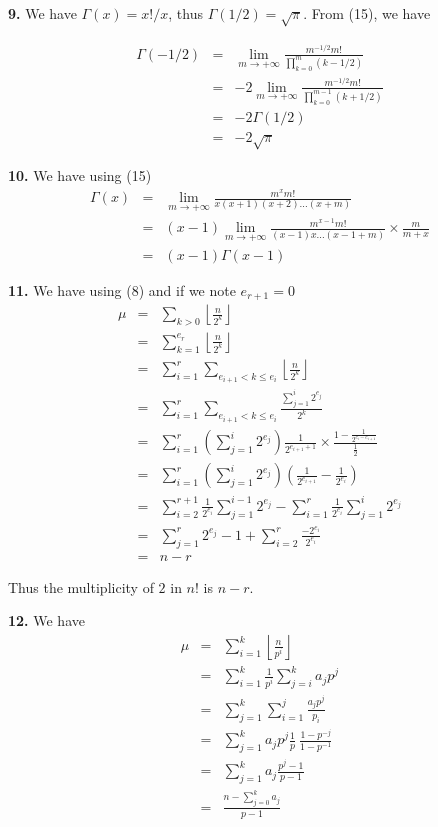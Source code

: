 \documentclass[a4paper,12pt]{article}
\newcommand{\newpar}[1]{\bigskip \noindent \textbf{#1.}}
\begin{document}
\newpar{9}  We have $\Gamma(x) = x!/x$, thus $\Gamma(1/2) =
\sqrt{\pi}$.  From (15), we have

\begin{eqnarray*}
  \Gamma(-1/2) &=& \lim_{m\to +\infty} \frac{m^{-1/2}
    m!}{\prod_{k=0}^m (k-1/2)} \\
  &=& -2\lim_{m\to +\infty} \frac{m^{-1/2}m!}{\prod_{k=0}^{m-1}(k +
    1/2)} \\
  &=& -2 \Gamma(1/2) \\
  &=& -2 \sqrt{\pi}
\end{eqnarray*}

\newpar{10} We have using (15)
\begin{eqnarray*}
  \Gamma(x) &=& \lim_{m\to +\infty} \frac{m^x m!}{x(x+1)(x+2)\ldots
    (x+m)} \\
  &=& (x-1) \lim_{m \to +\infty} \frac{m^{x-1} m!}{(x-1)x \ldots
    (x-1+m)} \times \frac{m}{m+x} \\
  &=& (x-1) \Gamma(x-1)
\end{eqnarray*}

\newpar{11} We have using (8) and if we note $e_{r+1} = 0$
\begin{eqnarray*}
  \mu &=& \sum_{k>0} \left\lfloor \frac{n}{2^k} \right\rfloor \\
  &=& \sum_{k=1}^{e_r} \left\lfloor \frac{n}{2^k} \right\rfloor \\
  &=& \sum_{i=1}^r \sum_{e_{i+1} < k \le e_i} \left\lfloor
  \frac{n}{2^k} \right\rfloor \\
  &=& \sum_{i=1}^r \sum_{e_{i+1} < k\le e_i} \frac{\sum_{j=1}^i
    2^{e_j}}{2^k} \\
  &=& \sum_{i=1}^r \left(\sum_{j=1}^i 2^{e_j}\right)
  \frac{1}{2^{e_{i+1}+1}} \times \frac{1 - \frac{1}{2^{e_i -
        e_{i+1}}}}{\frac{1}{2}} \\
  &=& \sum_{i=1}^r \left(\sum_{j=1}^i 2^{e_j}\right) \left(
  \frac{1}{2^{e_{i+1}}} - \frac{1}{2^{e_i}} \right) \\
  &=& \sum_{i=2}^{r+1} \frac{1}{2^{e_i}} \sum_{j=1}^{i-1} 2^{e_j} -
  \sum_{i=1}^r \frac{1}{2^{e_i}} \sum_{j=1}^i 2^{e_j} \\
  &=& \sum_{j=1}^r 2^{e_j} - 1 + \sum_{i=2}^r \frac{-
    2^{e_i}}{2^{e_i}} \\
  &=& n - r
\end{eqnarray*}

Thus the multiplicity of $2$ in $n!$ is $n-r$.

\newpar{12} We have
\begin{eqnarray*}
  \mu &=& \sum_{i=1}^k \left\lfloor \frac{n}{p^i} \right\rfloor \\
  &=& \sum_{i=1}^k \frac{1}{p^i} \sum_{j=i}^k a_j p^j \\
  &=& \sum_{j=1}^k \sum_{i=1}^j \frac{a_j p^j}{p_i} \\
  &=& \sum_{j=1}^k a_j p^j \frac{1}{p}\ \frac{1 - p^{-j}}{1 -
    p^{-1}}\\
  &=& \sum_{j=1}^k a_j \frac{p^j - 1}{p-1} \\
  &=& \frac{n - \sum_{j=0}^k a_j}{p-1}
\end{eqnarray*}
\end{document}
